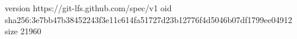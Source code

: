 version https://git-lfs.github.com/spec/v1
oid sha256:3e7bb47b38452243f3e11c614fa51727d23b12776f4d5046b07df1799ee04912
size 21960
